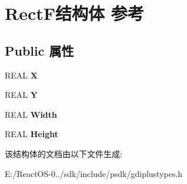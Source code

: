 \hypertarget{struct_rect_f}{}\section{Rect\+F结构体 参考}
\label{struct_rect_f}
\subsection*{Public 属性}
\begin{DoxyCompactItemize}
\item 
\mbox{\label{struct_rect_f_a4716a1d2ef6ee1392336a34d3c932197}} 
R\+E\+AL {\bfseries X}
\item 
\mbox{\label{struct_rect_f_ac085c93090e83bd3e2f2b43f2f7a697a}} 
R\+E\+AL {\bfseries Y}
\item 
\mbox{\label{struct_rect_f_a999a3900ae5781b75de8b48e0b098938}} 
R\+E\+AL {\bfseries Width}
\item 
\mbox{\label{struct_rect_f_a13b92cf8c782878bf150cf9a0741f781}} 
R\+E\+AL {\bfseries Height}
\end{DoxyCompactItemize}


该结构体的文档由以下文件生成\+:\begin{DoxyCompactItemize}
\item 
E\+:/\+React\+O\+S-\/0../sdk/include/psdk/gdiplustypes.\+h\end{DoxyCompactItemize}
